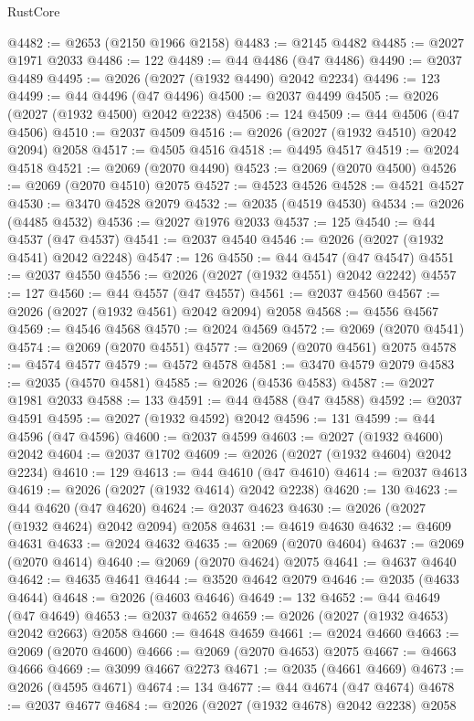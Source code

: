 \begin{lexlean}{RustCore}
\begin{coremodule}
@4482 := @2653 (@2150 @1966 @2158)
@4483 := @2145 @4482
@4485 := @2027 @1971 @2033
@4486 := 122
@4489 := @44 @4486 (@47 @4486)
@4490 := @2037 @4489
@4495 := @2026 (@2027 (@1932 @4490) @2042 @2234)
@4496 := 123
@4499 := @44 @4496 (@47 @4496)
@4500 := @2037 @4499
@4505 := @2026 (@2027 (@1932 @4500) @2042 @2238)
@4506 := 124
@4509 := @44 @4506 (@47 @4506)
@4510 := @2037 @4509
@4516 := @2026 (@2027 (@1932 @4510) @2042 @2094) @2058
@4517 := @4505 @4516
@4518 := @4495 @4517
@4519 := @2024 @4518
@4521 := @2069 (@2070 @4490)
@4523 := @2069 (@2070 @4500)
@4526 := @2069 (@2070 @4510) @2075
@4527 := @4523 @4526
@4528 := @4521 @4527
@4530 := @3470 @4528 @2079
@4532 := @2035 (@4519 @4530)
@4534 := @2026 (@4485 @4532)
@4536 := @2027 @1976 @2033
@4537 := 125
@4540 := @44 @4537 (@47 @4537)
@4541 := @2037 @4540
@4546 := @2026 (@2027 (@1932 @4541) @2042 @2248)
@4547 := 126
@4550 := @44 @4547 (@47 @4547)
@4551 := @2037 @4550
@4556 := @2026 (@2027 (@1932 @4551) @2042 @2242)
@4557 := 127
@4560 := @44 @4557 (@47 @4557)
@4561 := @2037 @4560
@4567 := @2026 (@2027 (@1932 @4561) @2042 @2094) @2058
@4568 := @4556 @4567
@4569 := @4546 @4568
@4570 := @2024 @4569
@4572 := @2069 (@2070 @4541)
@4574 := @2069 (@2070 @4551)
@4577 := @2069 (@2070 @4561) @2075
@4578 := @4574 @4577
@4579 := @4572 @4578
@4581 := @3470 @4579 @2079
@4583 := @2035 (@4570 @4581)
@4585 := @2026 (@4536 @4583)
@4587 := @2027 @1981 @2033
@4588 := 133
@4591 := @44 @4588 (@47 @4588)
@4592 := @2037 @4591
@4595 := @2027 (@1932 @4592) @2042
@4596 := 131
@4599 := @44 @4596 (@47 @4596)
@4600 := @2037 @4599
@4603 := @2027 (@1932 @4600) @2042
@4604 := @2037 @1702
@4609 := @2026 (@2027 (@1932 @4604) @2042 @2234)
@4610 := 129
@4613 := @44 @4610 (@47 @4610)
@4614 := @2037 @4613
@4619 := @2026 (@2027 (@1932 @4614) @2042 @2238)
@4620 := 130
@4623 := @44 @4620 (@47 @4620)
@4624 := @2037 @4623
@4630 := @2026 (@2027 (@1932 @4624) @2042 @2094) @2058
@4631 := @4619 @4630
@4632 := @4609 @4631
@4633 := @2024 @4632
@4635 := @2069 (@2070 @4604)
@4637 := @2069 (@2070 @4614)
@4640 := @2069 (@2070 @4624) @2075
@4641 := @4637 @4640
@4642 := @4635 @4641
@4644 := @3520 @4642 @2079
@4646 := @2035 (@4633 @4644)
@4648 := @2026 (@4603 @4646)
@4649 := 132
@4652 := @44 @4649 (@47 @4649)
@4653 := @2037 @4652
@4659 := @2026 (@2027 (@1932 @4653) @2042 @2663) @2058
@4660 := @4648 @4659
@4661 := @2024 @4660
@4663 := @2069 (@2070 @4600)
@4666 := @2069 (@2070 @4653) @2075
@4667 := @4663 @4666
@4669 := @3099 @4667 @2273
@4671 := @2035 (@4661 @4669)
@4673 := @2026 (@4595 @4671)
@4674 := 134
@4677 := @44 @4674 (@47 @4674)
@4678 := @2037 @4677
@4684 := @2026 (@2027 (@1932 @4678) @2042 @2238) @2058

\end{coremodule}
\end{lexlean}
